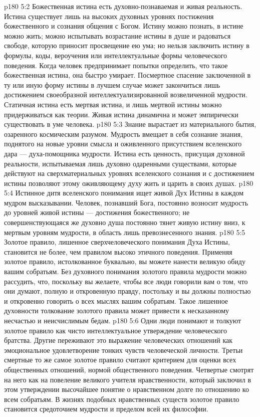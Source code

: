 \vs p180 5:2 Божественная истина есть духовно\hyp{}познаваемая и живая реальность. Истина существует лишь на высоких духовных уровнях постижения божественного и сознания общения с Богом. Истину можно познать, в истине можно жить; можно испытывать возрастание истины в душе и радоваться свободе, которую приносит просвещение ею ума; но нельзя заключить истину в формулы, коды, вероучения или интеллектуальные формы человеческого поведения. Когда человек предпринимает попытки определить, что такое божественная истина, она быстро умирает. Посмертное спасение заключенной в ту или иную форму истины в лучшем случае может закончиться лишь достижением своеобразной интеллектуализированной возвеличенной мудрости. Статичная истина есть мертвая истина, и лишь мертвой истины можно придерживаться как теории. Живая истина динамична и может эмпирически существовать в уме человека.
\vs p180 5:3 Знание вырастает из материального бытия, озаренного космическим разумом. Мудрость вмещает в себя сознание знания, поднятого на новые уровни смысла и оживленного присутствием вселенского дара --- духа\hyp{}помощника мудрости. Истина есть ценность, присущая духовной реальности, испытываемая лишь духовно одаренными существами, которые действуют на сверхматериальных уровнях вселенского сознания и с достижением истины позволяют этому оживляющему духу жить и царить в своих душах.
\vs p180 5:4 Истинное дитя вселенского понимания ищет живой Дух Истины в каждом мудром высказывании. Человек, познавший Бога, постоянно возносит мудрость до уровней живой истины --- достижения божественного; не совершенствующаяся же духовно душа постоянно тянет живую истину вниз, к мертвым уровням мудрости, в область лишь превознесенного знания.
\vs p180 5:5 Золотое правило, лишенное сверхчеловеческого понимания Духа Истины, становится не более, чем правилом высоко этичного поведения. Применяя золотое правило, истолкованное буквально, вы можете нанести великую обиду вашим собратьям. Без духовного понимания золотого правила мудрости можно рассудить, что, поскольку вы желаете, чтобы все люди говорили вам о том, что они думают, полную и откровенную правду, постольку и вы должны полностью и откровенно говорить о всех мыслях вашим собратьям. Такое лишенное духовности толкование золотого правила может привести к несказанному несчастью и неисчислимым бедам.
\vs p180 5:6 Одни люди понимают и толкуют золотое правило как чисто интеллектуальное утверждение человеческого братства. Другие переживают это выражение человеческих отношений как эмоциональное удовлетворение тонких чувств человеческой личности. Третьи смертные то же самое золотое правило считают критерием для оценки всех общественных отношений, нормой общественного поведения. Четвертые смотрят на него как на повеление великого учителя нравственности, который заключил в этом утверждении высочайшее понятие о нравственном долге по отношению ко всем собратьям. В жизнях подобных нравственных существ золотое правило становится средоточием мудрости и пределом всей их философии.
